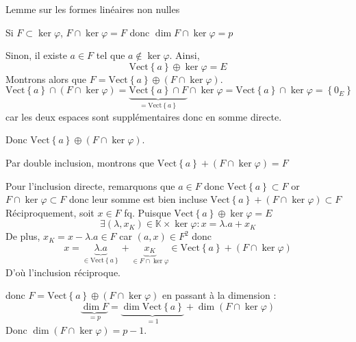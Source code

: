 \documentclass{article}
\begin{document}
\begin{question_kholle}[{
Soient $E$ un $\mathbb{K}$-espace vectoriel, et $\varphi \in E^{*}$ une forme linéaire \emph{non nulle}. Soit $F$ un sous-espace vectoriel de $E$ de dimension finie $p \in \mathbb{N}$, alors
$$\dim_{\mathbb{K}}F \cap \ker \varphi = \left\{ \begin{array}{ll} p  & \text{ si }F \subset \ker \varphi \\ p-1  & \text{ sinon}\end{array}\right.$$
En particulier, on a toujours $\dim_{\mathbb{K}}F \cap \ker F \geqslant p-1$}]{Lemme sur les formes linéaires non nulles}

Si $F \subset \ker\varphi$, $F \cap \ker \varphi = F$ donc $\dim F \cap \ker \varphi = p$

Sinon, il existe $a \in F$ tel que $a \not\in \ker \varphi$. Ainsi,
$$
\text{Vect}\left\{ a \right\}  \oplus \ker \varphi = E
$$
Montrons alors que $F = \text{Vect} \left\{ a \right\} \oplus (F \cap \ker \varphi)$.
$$\text{Vect} \left\{ a \right\} \cap (F \cap \ker \varphi) = \underbrace{ \text{Vect} \left\{ a \right\} \cap F }_{ =\text{Vect}\left\{ a \right\}  } \cap \ker \varphi = \text{Vect}\left\{ a \right\}  \cap \ker \varphi = \left\{ 0_{E} \right\} $$ car les deux espaces sont supplémentaires donc en somme directe.

Donc $\text{Vect} \left\{ a \right\} \oplus (F \cap \ker \varphi)$.

Par double inclusion, montrons que $\text{Vect} \left\{ a \right\} + (F \cap \ker \varphi) = F$

Pour l'inclusion directe, remarquons que $a \in F$ donc $\text{Vect}\left\{ a \right\} \subset F$ or $F \cap \ker \varphi \subset F$ donc leur somme est bien incluse $\text{Vect} \left\{ a \right\} + (F \cap \ker \varphi) \subset F$
Réciproquement, soit $x \in F$ fq.
Puisque $\text{Vect} \left\{ a \right\} \oplus \ker \varphi = E$
$$
\exists (\lambda, x_{K}) \in \mathbb{K} \times \ker \varphi : x = \lambda .a+x_{K}
$$
De plus, $x_{K} = x - \lambda.a \in F$ car $(a, x) \in F^{2}$ donc
$$
x = \underbrace{ \lambda . a }_{ \in \text{Vect} \left\{ a \right\}  } + \underbrace{ x_{K} }_{ \in F \cap \ker \varphi } \in \text{Vect} \left\{ a \right\} + (F \cap \ker \varphi)
$$
D'où l'inclusion réciproque.

donc $F = \text{Vect} \left\{ a \right\} \oplus (F \cap \ker \varphi)$
en passant à la dimension :
$$
\underbrace{ \dim F }_{= p } = \underbrace{ \dim \text{Vect} \left\{ a \right\} }_{ =1 } + \dim (F \cap \ker \varphi)
$$
Donc $\dim (F \cap \ker \varphi) = p - 1$.




\end{question_kholle}
\end{document}
